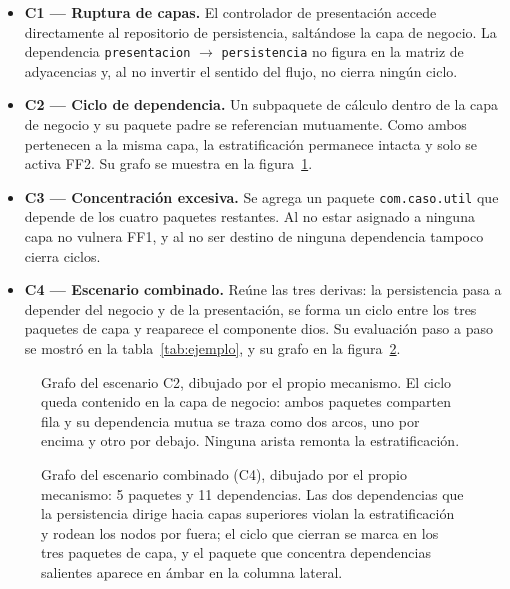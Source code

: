 \begin{itemize}
    \item \textbf{C1 — Ruptura de capas.} El controlador de presentación accede directamente al repositorio de persistencia, saltándose la capa de negocio. La dependencia \texttt{presentacion} $\rightarrow$ \texttt{persistencia} no figura en la matriz de adyacencias y, al no invertir el sentido del flujo, no cierra ningún ciclo.
    \item \textbf{C2 — Ciclo de dependencia.} Un subpaquete de cálculo dentro de la capa de negocio y su paquete padre se referencian mutuamente. Como ambos pertenecen a la misma capa, la estratificación permanece intacta y solo se activa FF2. Su grafo se muestra en la figura~\ref{fig:grafo-ciclo}.
    \item \textbf{C3 — Concentración excesiva.} Se agrega un paquete \texttt{com.caso.util} que depende de los cuatro paquetes restantes. Al no estar asignado a ninguna capa no vulnera FF1, y al no ser destino de ninguna dependencia tampoco cierra ciclos.
    \item \textbf{C4 — Escenario combinado.} Reúne las tres derivas: la persistencia pasa a depender del negocio y de la presentación, se forma un ciclo entre los tres paquetes de capa y reaparece el componente dios. Su evaluación paso a paso se mostró en la tabla~\ref{tab:ejemplo}, y su grafo en la figura~\ref{fig:grafo-alterado}.
\end{itemize}

\begin{figure}[H]
\centering
{}
\caption{Grafo del escenario C2, dibujado por el propio mecanismo. El ciclo queda contenido en la capa de negocio: ambos paquetes comparten fila y su dependencia mutua se traza como dos arcos, uno por encima y otro por debajo. Ninguna arista remonta la estratificación.}
\label{fig:grafo-ciclo}
\end{figure}

\begin{figure}[H]
\centering
{}
\caption{Grafo del escenario combinado (C4), dibujado por el propio mecanismo: 5 paquetes y 11 dependencias. Las dos dependencias que la persistencia dirige hacia capas superiores violan la estratificación y rodean los nodos por fuera; el ciclo que cierran se marca en los tres paquetes de capa, y el paquete que concentra dependencias salientes aparece en ámbar en la columna lateral.}
\label{fig:grafo-alterado}
\end{figure}

